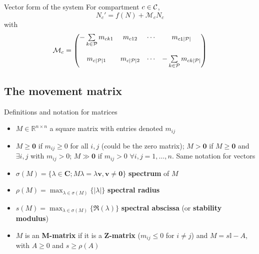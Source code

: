 \documentclass[aspectratio=169]{beamer}\usepackage[]{graphicx}\usepackage[]{xcolor}
\begin{document}
\begin{frame}{Vector form of the system}
For compartment $c\in\C$,
\begin{equation}\label{eq:general_metapop}
N_c'=f(N)+\mathcal{M}_cN_c
\end{equation}
with
\begin{equation}\label{eq:movement_matrix}
\mathcal{M}_c =
\begin{pmatrix}
-\sum\limits_{k\in\P}m_{ck1} & m_{c12} & \cdots & m_{c1|\P|} \\
& & & \\
m_{c|\P|1} & m_{c|\P|2} & \cdots & -\sum\limits_{k\in\P}m_{ck|\P|}
\end{pmatrix}
\end{equation}
\end{frame}


\subsection{The movement matrix}

\begin{frame}{Definitions and notation for matrices}
\begin{itemize}
	\item $M\in\mathbb{R}^{n\times n}$ a square matrix with entries denoted $m_{ij}$
	\vfill
	\item $M\geq\mathbf{0}$ if $m_{ij}\geq 0$ for all $i,j$ (could be the zero matrix); $M>\mathbf{0}$ if $M\geq\mathbf{0}$ and $\exists i,j$ with $m_{ij}>0$; $M\gg\mathbf{0}$ if $m_{ij}>0$ $\forall i,j=1,\ldots,n$. Same notation for vectors
	\vfill
	\item $\sigma(M)=\{\lambda\in\mathbf{C}; M\lambda=\lambda\mathbf{v}, \mathbf{v}\neq\mathbf{0}\}$ \textbf{spectrum} of $M$
	\vfill
	\item $\rho(M)=\max_{\lambda\in\sigma(M)}\{|\lambda|\}$ \textbf{spectral radius}
	\vfill
	\item $s(M)=\max_{\lambda\in\sigma(M)}\{\Re(\lambda)\}$ \textbf{spectral abscissa} (or \textbf{stability modulus})
	\vfill
	\item $M$ is an \textbf{M-matrix} if it is a \textbf{Z-matrix} ($m_{ij}\leq 0$ for $i\neq j$) and $M = s\mathbb{I}-A$, with $A\geq 0$ and $s\geq \rho(A)$
\end{itemize}
\end{frame}
\end{document}
